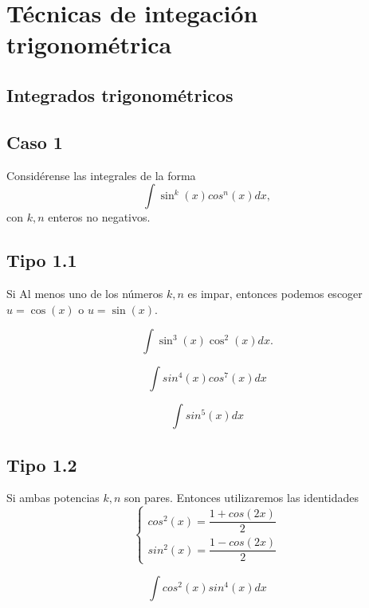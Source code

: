 \section{Técnicas de integaci\'on trigonométrica}

\subsection{Integrados trigonométricos}


\subsection{Caso 1}
 Considérense las integrales de la forma 
 $$
 \int \sin^{k}(x)cos^{n}(x)dx, 
 $$ con $k,n$ enteros no negativos.



\subsection{Tipo 1.1}
 Si Al menos uno de los números $k,n$ es impar, entonces podemos escoger $u=\cos(x)$ o $u=\sin(x).$



 \begin{problema}
  \label{ayr:32.1}
  $$
  \int \sin^{3}(x)\cos^{2}(x)dx.
  $$
 \end{problema}




 \begin{problema}
 \label{ayr:32.2}
  $$
  \int sin^{4}(x)cos^{7}(x)dx
  $$
 \end{problema}




 \begin{problema}
  \label{ayr:32.3}
  $$
  \int sin^{5}(x)dx
  $$
 \end{problema}




\subsection{Tipo 1.2}
 Si ambas potencias $k,n$ son pares. Entonces utilizaremos las identidades
 $$\begin{cases}
    cos^{2}(x)=\dfrac{1+cos(2x)}{2}\\
    sin^{2}(x)=\dfrac{1-cos(2x)}{2}
   \end{cases}
$$



 \begin{problema}
  \label{ayr:32.4}
  $$
  \int cos^{2}(x)sin^{4}(x)dx
  $$
 \end{problema}




